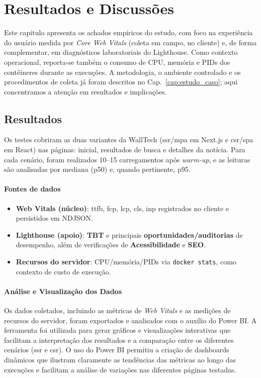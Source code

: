 \chapter{Resultados e Discussões}
\label{cap:resultados}

Este capítulo apresenta os achados empíricos do estudo, com foco na experiência do usuário medida por \textit{Core Web Vitals} (coleta em campo, no cliente) e, de forma complementar, em diagnósticos laboratoriais do Lighthouse. Como contexto operacional, reporta-se também o consumo de CPU, memória e PIDs dos contêineres durante as execuções. A metodologia, o ambiente controlado e os procedimentos de coleta já foram descritos no Cap.~\ref{cap:estudo_caso}; aqui concentramos a atenção em resultados e implicações.

\section{Resultados}
Os testes cobriram as duas variantes da WallTech (\acrshort{ssr}/\acrshort{mpa} em Next.js e \acrshort{csr}/\acrshort{spa} em React) nas páginas: inicial, resultados de busca e detalhes da notícia. Para cada cenário, foram realizados 10--15 carregamentos após \textit{warm-up}, e as leituras são analisadas por mediana (p50) e, quando pertinente, p95.

\subsubsection*{Fontes de dados}
\begin{itemize}
  \item \textbf{Web Vitals (núcleo)}: \acrshort{ttfb}, \acrshort{fcp}, \acrshort{lcp}, \acrshort{cls}, \acrshort{inp} registrados no cliente e persistidos em NDJSON.
  \item \textbf{Lighthouse (apoio)}: \textbf{TBT} e principais \textbf{oportunidades/auditorias} de desempenho, além de verificações de \textbf{Acessibilidade} e \textbf{SEO}.
  \item \textbf{Recursos do servidor}: CPU/memória/PIDs via \texttt{docker stats}, como contexto de custo de execução.
\end{itemize}

\subsubsection*{Análise e Visualização dos Dados}
Os dados coletados, incluindo as métricas de \textit{Web Vitals} e as medições de recursos do servidor, foram exportados e analisados com o auxílio do Power BI. A ferramenta foi utilizada para gerar gráficos e visualizações interativas que facilitam a interpretação dos resultados e a comparação entre os diferentes cenários (\acrshort{ssr} e \acrshort{csr}). O uso do Power BI permitiu a criação de dashboards dinâmicos que ilustram claramente as tendências das métricas ao longo das execuções e facilitam a análise de variações nas diferentes páginas testadas.


